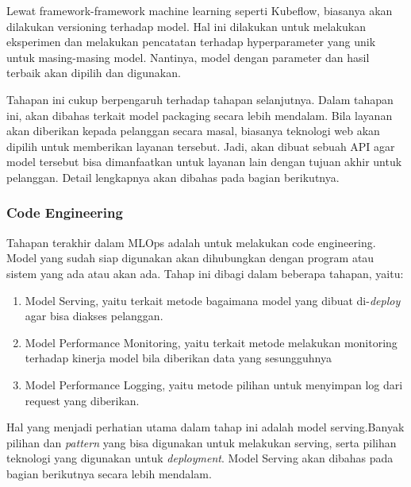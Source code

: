 Lewat framework-framework machine learning seperti Kubeflow, biasanya akan dilakukan versioning terhadap model.
Hal ini dilakukan untuk melakukan eksperimen dan melakukan pencatatan terhadap hyperparameter yang unik untuk masing-masing model.
Nantinya, model dengan parameter dan hasil terbaik akan dipilih dan digunakan.

Tahapan ini cukup berpengaruh terhadap tahapan selanjutnya.
Dalam tahapan ini, akan dibahas terkait model packaging secara lebih mendalam.
Bila layanan akan diberikan kepada pelanggan secara masal, biasanya teknologi web akan dipilih untuk memberikan layanan tersebut.
Jadi, akan dibuat sebuah API agar model tersebut bisa dimanfaatkan untuk layanan lain dengan tujuan akhir untuk pelanggan. Detail lengkapnya akan dibahas pada bagian berikutnya. 

\subsubsection{Code Engineering}

Tahapan terakhir dalam MLOps adalah untuk melakukan code engineering.
Model yang sudah siap digunakan akan dihubungkan dengan program atau sistem yang ada atau akan ada.
Tahap ini dibagi dalam beberapa tahapan, yaitu:

\begin{enumerate}
  \item Model Serving, yaitu terkait metode bagaimana model yang dibuat di-\textit{deploy} agar bisa diakses pelanggan.
  \item Model Performance Monitoring, yaitu terkait metode melakukan monitoring terhadap kinerja model bila diberikan data yang sesungguhnya
  \item Model Performance Logging, yaitu metode pilihan untuk menyimpan log dari request yang diberikan.
\end{enumerate}

Hal yang menjadi perhatian utama dalam tahap ini adalah model serving.Banyak pilihan dan \textit{pattern} yang bisa digunakan untuk melakukan serving, serta pilihan teknologi yang digunakan untuk \textit{deployment}.
Model Serving akan dibahas pada bagian berikutnya secara lebih mendalam.